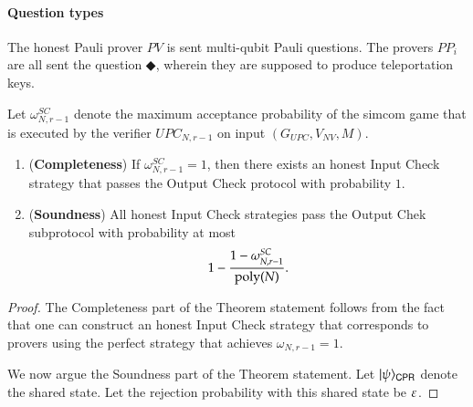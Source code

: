 
\paragraph{Question types} 
The honest Pauli prover $PV$ is sent multi-qubit Pauli questions. The provers $PP_i$ are all sent the question $\Diamondblack$, wherein they are supposed to produce teleportation keys.

\begin{lemma}	
\label{lem:output_check}
Let $\omega_{N,r-1}^{SC}$ denote the maximum acceptance probability of the simcom game that is executed by the verifier $UPC_{N,r-1}$ on input $(G_{UPC},V_{NV},M)$. 
\begin{enumerate}
	\item (\textbf{Completeness}) If $\omega_{N,r-1}^{SC} = 1$, then there exists an honest Input Check strategy that passes the Output Check protocol with probability $1$.
	
	\item (\textbf{Soundness}) All honest Input Check strategies pass the Output Chek subprotocol with probability at most 
\[
	1 - \frac{1 - \omega_{N,r-1}^{SC}}{\operatorname{poly}(N)}.
\] 
\end{enumerate}
\end{lemma}
\begin{proof}
The Completeness part of the Theorem statement follows from the fact that one can construct an honest Input Check strategy that corresponds to provers using the perfect strategy that achieves $\omega_{N,r-1} = 1$.

We now argue the Soundness part of the Theorem statement. Let $|\psi\rangle_{{\mathsf{C}} {\mathsf{P}} {\mathsf{R}}}$ denote the shared state. Let the rejection probability with this shared state be $\varepsilon$. 

\end{proof}



